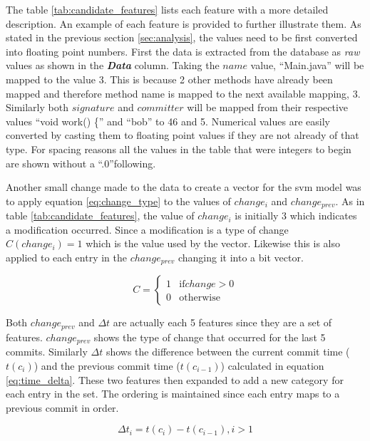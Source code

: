 The table \ref{tab:candidate_features} lists each feature with a more detailed description. An example of each feature is provided to further illustrate them. As stated in the previous section \ref{sec:analysis}, the values need to be first converted into floating point numbers. First the data is extracted from the database as \textit{raw} values as shown in the \textit{\textbf{Data}} column. Taking the $name$ value, ``Main.java'' will be mapped to the value 3. This is because 2 other methods have already been mapped and therefore method name is mapped to the next available mapping, 3. Similarly both $signature$ and $committer$ will be mapped from their respective values ``void work() \{'' and ``bob'' to 46 and 5. Numerical values are easily converted by casting them to floating point values if they are not already of that type. For spacing reasons all the values in the table that were integers to begin are shown without a ``.0''following.

Another small change made to the data to create a vector for the \gls{svm} model was to apply equation \ref{eq:change_type} to the values of $change_i$ and $change_{prev}$. As in table \ref{tab:candidate_features}, the value of $change_i$ is initially 3 which indicates a modification occurred. Since a modification is a type of change $C(change_i) = 1$ which is the value used by the vector. Likewise this is also applied to each entry in the $change_{prev}$ changing it into a bit vector.

\begin{equation} 
\label{eq:change_type}
C = \left\{\begin{matrix}
1 & \text{if} change > 0 \\
0 & \text{otherwise}
\end{matrix}\right.
\end{equation}

Both $change_{prev}$ and $\Delta t$ are actually each 5 features since they are a set of features. $change_{prev}$ shows the type of change that occurred for the last 5 commits. Similarly $\Delta t$ shows the difference between the current commit time ($t(c_i)$) and the previous commit time ($t(c_{i-1})$) calculated in equation \ref{eq:time_delta}. These two features then expanded to add a new category for each entry in the set. The ordering is maintained since each entry maps to a previous commit in order.

\begin{equation}
\label{eq:time_delta}
\Delta t_{i} = t(c_i) - t(c_{i-1}), i > 1
\end{equation}

